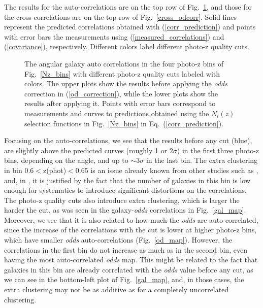The results for the auto-correlations are on the top row of Fig.~\ref{auto_odcorr}, and those for the cross-correlations are on the top row of Fig.~\ref{cross_odcorr}. Solid lines represent the predicted correlations obtained with (\ref{corr_prediction}) and points with error bars the measurements using (\ref{measured_correlations}) and (\ref{covariance}), respectively. Different colors label different photo-z quality cuts.
\begin{figure}
\centering
{}
\caption{The angular galaxy auto correlations in the four photo-z bins of Fig.~\ref{Nz_bins} with different photo-z quality cuts labeled with colors. The upper plots show the results before applying the \textit{odds} correction in (\ref{od_correction}), while the lower plots show the results after applying it. Points with error bars correspond to measurements and curves to predictions obtained using the $N_i(z)$ selection functions in Fig.~\ref{Nz_bins} in 
Eq.~(\ref{corr_prediction}).}
\label{auto_odcorr}
\end{figure}

Focusing on the auto-correlations, we see that the results before any cut (blue), are slightly above the predicted curves (roughly 1 or $2\sigma$) in the first three photo-z bins, depending on the angle, and up to $\sim3\sigma$ in the last bin. The extra clustering in bin 0.6$<$z(phot)$<$0.65 is an issue already known from other studies such as \citet{Thomas2011a, Blake2008}, and, in \citet{Crocce2011}, it is justified by the fact that the number of galaxies in this bin is low enough for systematics to introduce significant distortions on the correlations. The photo-z quality cuts also introduce extra clustering, which is larger the harder the cut, as was seen in the galaxy-\textit{odds} correlations in Fig.~\ref{gal_map}. Moreover, we see that it is also related to how much the \textit{odds} are auto-correlated, since the increase of the correlations with the cut is lower at higher photo-z bins, which have smaller \textit{odds} auto-correlations (Fig.~\ref{od_map}). However, the correlations in the first bin do not increase as much as in the second bin, even having the most auto-correlated \textit{odds} map. This might be related to the fact that galaxies in this bin are already correlated with the {\it odds} value before any cut, as we can see in the bottom-left plot of Fig.~\ref{gal_map}, and, in those cases, the extra clustering may not be as additive as for a completely uncorrelated clustering.

